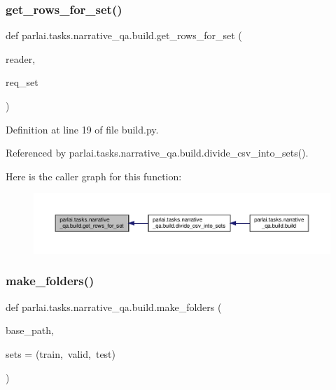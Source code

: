 \subsubsection{\texorpdfstring{get\+\_\+rows\+\_\+for\+\_\+set()}{get\_rows\_for\_set()}}
{\footnotesize\ttfamily def parlai.\+tasks.\+narrative\+\_\+qa.\+build.\+get\+\_\+rows\+\_\+for\+\_\+set (\begin{DoxyParamCaption}\item[{}]{reader,  }\item[{}]{req\+\_\+set }\end{DoxyParamCaption})}



Definition at line 19 of file build.\+py.



Referenced by parlai.\+tasks.\+narrative\+\_\+qa.\+build.\+divide\+\_\+csv\+\_\+into\+\_\+sets().

Here is the caller graph for this function\+:
\nopagebreak
\begin{figure}[H]
\begin{center}
\leavevmode
\includegraphics[width=350pt]{namespaceparlai_1_1tasks_1_1narrative__qa_1_1build_a8d4e1f30e3de3f62c039296cbed12e8d_icgraph}
\end{center}
\end{figure}
\mbox{\label{namespaceparlai_1_1tasks_1_1narrative__qa_1_1build_a602f90b82e6c6eafbd13647ba7567101}} 
\subsubsection{\texorpdfstring{make\+\_\+folders()}{make\_folders()}}
{\footnotesize\ttfamily def parlai.\+tasks.\+narrative\+\_\+qa.\+build.\+make\+\_\+folders (\begin{DoxyParamCaption}\item[{}]{base\+\_\+path,  }\item[{}]{sets = {\ttfamily (\textquotesingle{}train\textquotesingle{},~\textquotesingle{}valid\textquotesingle{},~\textquotesingle{}test\textquotesingle{})} }\end{DoxyParamCaption})}



